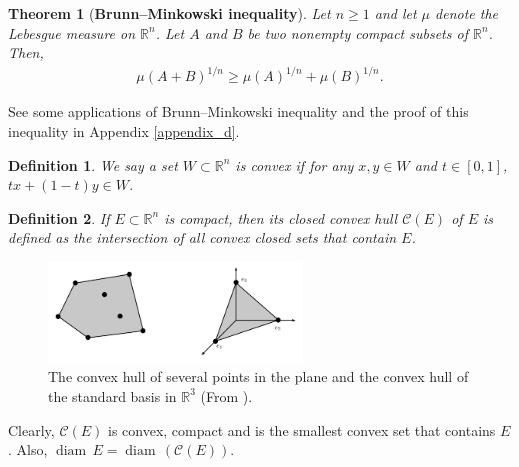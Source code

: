 \documentclass[11pt]{book}
\newtheorem{definition}{Definition}[chapter]
\newtheorem{theorem}{Theorem}[chapter]
\theoremstyle{definition}
\numberwithin{equation}{chapter}
\def\diam{{\operatorname{diam}\,}}
\begin{document}
\medskip

\begin{theorem}[{\bf Brunn–Minkowski inequality}]\label{theorem_130}
Let $n \geq 1$ and let $\mu$ denote the Lebesgue measure on $\mathbb{R}^n$. Let $A$ and $B$ be two nonempty compact subsets of $\mathbb{R}^n$. Then,
\begin{align*}
    \mu(A + B)^{1/n} \geq \mu(A)^{1/n} + \mu(B)^{1/n}.
\end{align*}
\end{theorem}

\medskip

See some applications of Brunn–Minkowski inequality and the proof of this inequality in Appendix \ref{appendix_d}.

\medskip

\begin{definition}
We say a set $W \subset \mathbb{R}^n$ is convex if for any $x,y \in W$ and $t \in [0,1]$, $tx + (1-t)y \in W$.
\end{definition}

\medskip

\begin{definition}
If $E \subset \mathbb{R}^n$ is compact, then its closed convex hull $\mathcal{C}(E)$ of $E$ is defined as the intersection of all convex closed sets that contain $E$.
\end{definition}

\begin{figure}[H]
    \centering
    \includegraphics[width=0.6\textwidth]{convex_hull.png}
    \caption{The convex hull of several points in the plane and the convex hull of the standard basis in $\mathbb{R}^3$ (From \cite{31}).}
    \label{fig:convex_hull}
\end{figure}

\medskip

Clearly, $\mathcal{C}(E)$ is convex, compact and is the smallest convex set that contains $E$. Also, $\diam E = \diam (\mathcal{C}(E))$.

\medskip
\end{document}
